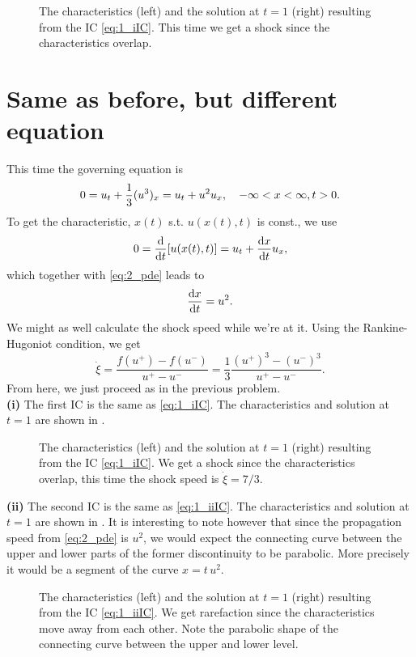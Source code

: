 \documentclass[11pt,letter, swedish, english
]{article}
\begin{document}
\begin{figure}
\centering
\resizebox{!}{3.6cm}{}
\caption{The characteristics (left) and the solution at $t=1$ (right)
  resulting from the IC \eqref{eq:1_iIC}. This time we get a shock
  since the characteristics overlap. } 
\label{fig:1ii}
\end{figure}



\section{Same as before, but different equation}
This time the governing equation is
\begin{equation}\label{eq:2_pde}
0 = u_t + \frac{1}{3} (u^3)_x = u_t + u^2u_x\qcomma
-\infty<x<\infty, t>0.
\end{equation}
To get the characteristic, $x(t)$ s.t. $u(x(t), t)$ is const., we use
\begin{equation}
0 = \dv{t} \qty[u(x(t), t)] = u_t + \dv{x}{t}u_x,
\end{equation}
which together with \eqref{eq:2_pde} leads to
\begin{equation}
\dv{x}{t} = u^2.
\end{equation}
We might as well calculate the shock speed while we're at it. Using
the Rankine-Hugoniot condition, we get
\begin{equation}
\dot\xi = \frac{f(u^+) - f(u^-) }{u^+ - u^-} 
= \frac{1}{3}\frac{(u^+)^3 - (u^-)^3}{u^+ - u^-}.
\end{equation}
From here, we just proceed as in the previous problem.
\\[11pt]
\noindent
\textbf{(i) }
The first IC is the same as \eqref{eq:1_iIC}.
The characteristics and solution at $t=1$ are shown in .

\begin{figure}
\centering
\resizebox{!}{3.6cm}{}
\caption{The characteristics (left) and the solution at $t=1$ (right)
  resulting from the IC \eqref{eq:1_iIC}. We get a shock
  since the characteristics overlap, this time the shock speed is
  $\dot\xi=7/3$. } 
\label{fig:2i}
\end{figure}

\noindent
\textbf{(ii) }
The second IC is the same as \eqref{eq:1_iiIC}.
The characteristics and solution at $t=1$ are shown in
. It is interesting to note however that since the
propagation speed from \eqref{eq:2_pde} is $u^2$, we would expect the
connecting curve between the upper and lower parts of the former
discontinuity to be parabolic. More precisely it would be a segment of
the curve $x= t\,u^2$.
\begin{figure}
\centering
\resizebox{!}{3.6cm}{}
\caption{The characteristics (left) and the solution at $t=1$ (right) 
  resulting from the IC \eqref{eq:1_iiIC}. We get rarefaction since
  the characteristics move away from each other. Note the parabolic
  shape of the connecting curve between the upper and lower level.} 
\label{fig:2ii}
\end{figure}
\end{document}
